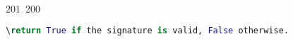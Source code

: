 201~200~\documentclass{article}
\begin{document}
\begin{lstlisting}[language=Python, caption=Signing and Verifying Messages]
	                                                                                                                                                                                                                                                                                                	                                                                                                                                        	    	                                                                                                	                                                                                                                                                                                                                                                                                                                                	                                                                        	                                                                        	                                                                                                                                        	                                                                                                                                                                                                                        	                                                                                                                            	                                                \return True if the signature is valid, False otherwise.
	                                                                                                                                                                                                                                                                                                	                                                                                                                                        	    	                                                                                                	                                                                                                                                                                                                                                                                                                                                	                                                                        	                                                                        	                                                                                                                                        	                                                                                                                                                                                                                        	                                                                                                                            	                                                    """

\end{lstlisting}
\end{document}
